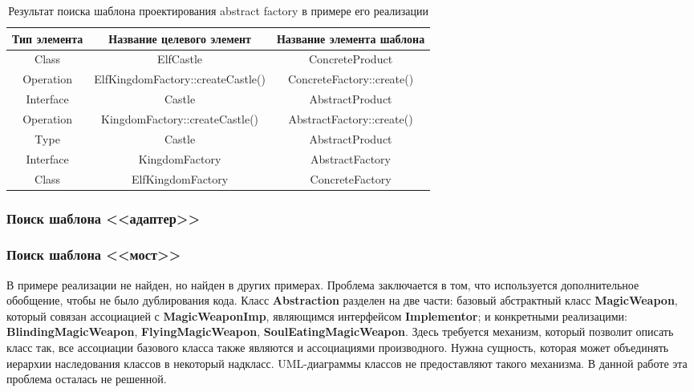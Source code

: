 \begin{table}[ht!]
    \centering
    \begin{tabulary}{\textwidth}{|C|C|C|}
        \hline
        Тип элемента & Название целевого элемент & Название элемента шаблона \\
        \hline
        Class & ElfCastle & ConcreteProduct \\
        \hline
        Operation & ElfKingdomFactory::createCastle() & ConcreteFactory::create() \\
        \hline
        Interface & Castle & AbstractProduct \\
        \hline
        Operation & KingdomFactory::createCastle() & AbstractFactory::create() \\
        \hline
        Type & Castle & AbstractProduct \\
        \hline
        Interface & KingdomFactory & AbstractFactory \\
        \hline
        Class & ElfKingdomFactory & ConcreteFactory \\
        \hline
    \end{tabulary}
    \caption{Результат поиска шаблона проектирования abstract factory в примере его реализации}
    \label{table:java-design-patterns-abstract-factory}
\end{table}


\subsubsection{Поиск шаблона <<адаптер>>}

\subsubsection{Поиск шаблона <<мост>>}

В примере реализации не найден, но найден в других примерах.
Проблема заключается в том, что используется дополнительное обобщение,
чтобы не было дублирования кода.
Класс \textbf{Abstraction} разделен на две части: базовый абстрактный класс
\textbf{MagicWeapon},
который совязан ассоциацией с \textbf{MagicWeaponImp},
являющимся интерфейсом \textbf{Implementor};
и конкретными реализацими: \textbf{BlindingMagicWeapon},
\textbf{FlyingMagicWeapon}, \textbf{SoulEatingMagicWeapon}.
Здесь требуется механизм, который позволит описать класс так,
все ассоциации базового класса также являются и ассоциациями производного.
Нужна сущность, которая может объединять иерархии наследования классов в
некоторый надкласс.
UML-диаграммы классов не предоставляют такого механизма.
В данной работе эта проблема осталась не решенной.

